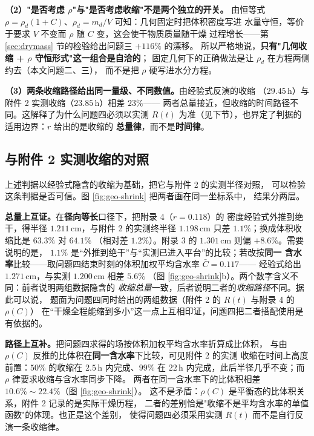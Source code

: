 \documentclass[12pt,a4paper,fontset=none]{ctexart}
\begin{document}
\textbf{（2）"是否考虑 $\rho$"与"是否考虑收缩"不是两个独立的开关。}
由恒等式 $\rho=\rho_d(1+C)$、$\rho_d=m_d/V$ 可知：几何固定时把体积密度写进
水量守恒，等价于要求 $V$ 不变而 $\rho$ 随 $C$ 变，这会使干物质质量随干燥
过程增长——第 \ref{sec:drymass} 节的检验给出问题三 $+116\%$ 的漂移。
所以严格地说，\textbf{只有"几何收缩 + $\rho$ 守恒形式"这一组合是自洽的}；
固定几何下的正确做法是让 $\rho_d$ 在方程两侧约去（本文问题二、三），
而不是把 $\rho$ 硬写进水分方程。

\textbf{（3）两条收缩路径给出同一量级、不同数值。}由经验式反演的收缩
（$29.45$\,h）与附件 2 实测收缩（$23.85$\,h）相差 $23\%$——
两者总量接近，但收缩的时间路径不同。这解释了为什么问题四必须以实测
$R(t)$ 为准（见下节），也界定了判据的适用边界：$r$ 给出的是收缩的
\textbf{总量律}，而不是\textbf{时间律}。

\subsection{与附件 2 实测收缩的对照}
\label{sec:p11-crosscheck}

上述判据以经验式隐含的收缩为基础，把它与附件 2 的实测半径对照，
可以检验这条判据是否可信。图 \ref{fig:geo-shrink} 把两者画在同一坐标系中，
结果分两层。

\textbf{总量上互证。}在\textbf{径向等长}口径下，把附录 4（$r=0.118$）的
密度经验式外推到绝干，得半径 $1.211$\,cm，与附件 2 的实测终半径
$1.198$\,cm 只差 $1.1\%$；换成体积收缩比是 $63.3\%$ 对 $64.1\%$
（相对差 $1.2\%$）。附录 3 的 $1.301$\,cm 则偏 $+8.6\%$。需要说明的是，
$1.1\%$ 是“外推到绝干”与“实测已进入平台”的比较；若改按\textbf{同一
含水率}比较——取问题四结束时刻的体积加权平均含水率 $\bar C=0.117$——
经验式给出 $1.271$\,cm，与实测 $1.200$\,cm 相差 $5.6\%$
（图 \ref{fig:geo-shrink}b）。两个数字含义不同：前者说明两组数据隐含的
\emph{收缩总量}一致，后者说明二者的\emph{收缩路径}不同。据此可以说，
题面为问题四同时给出的两组数据（附件 2 的 $R(t)$ 与附录 4 的 $\rho(C)$）
在“干燥全程能缩到多小”这一点上互相印证，问题四把二者搭配使用是有依据的。

\textbf{路径上互补。}把问题四求得的场按体积加权平均含水率折算成比体积，
与由 $\rho(C)$ 反推的比体积在\textbf{同一含水率}下比较，可见附件 2 的实测
收缩在时间上高度前置：$50\%$ 的收缩在 $2.5$\,h 内完成、$99\%$ 在 $22$\,h
内完成，此后半径几乎不变；而 $\rho$ 律要求收缩与含水率同步下降。
两者在同一含水率下的比体积相差 $10.6\%\sim22.4\%$（图 \ref{fig:geo-shrink}）。
这不是矛盾：$\rho(C)$ 是平衡态的比体积关系，附件 2 记录的是实际干燥历程，
二者的差别恰是"收缩不是平均含水率的单值函数"的体现。也正是这个差别，
使得问题四必须采用实测 $R(t)$ 而不是自行反演一条收缩律。
\end{document}
